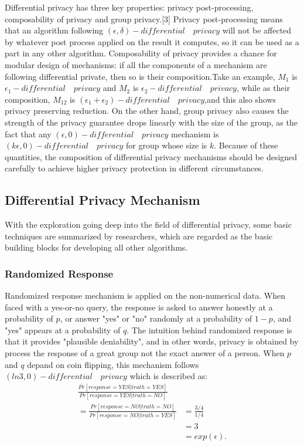\documentclass[conference]{IEEEtran}
\begin{document}
Differential privacy has three key properties: privacy post-processing, composability of privacy and group privacy.[3] Privacy post-processing means that an algorithm following $(\epsilon,\delta)-differential \quad privacy$ will not be affected by whatever post process applied on the result it computes, so it can be used as a part in any other algorithm. Composability of privacy provides a chance for modular design of mechanisms: if all the components of a mechanism are following differential private, then so is their composition.Take an example, $M_1$ is $\epsilon_1-differential \quad privacy$ and $M_2$ is $\epsilon_2-differential \quad privacy$, while as their composition, $M_12$ is $(\epsilon_1 +\epsilon_2)-differential \quad privacy$,and this also shows privacy preserving reduction. On the other hand, group privacy also causes the strength of the privacy guarantee drops linearly with the size of the group, as the fact that any $(\epsilon,0)-differential \quad privacy$ mechanism is $(k\epsilon,0)-differential \quad privacy$ for group whose size is $k$. Because of these quantities, the composition of differential privacy mechanisms should be designed carefully to achieve higher privacy protection in different circumstances.

\subsection{Differential Privacy Mechanism}
With the exploration going deep into the field of differential privacy, some basic techniques are summarized by researchers, which are regarded as the basic building blocks for developing all other algorithms.

\subsubsection{Randomized Response}
Randomized response mechanism is applied on the non-numerical data. When faced with a yes-or-no query, the response is asked to answer honestly at a probability of $p$, or answer "yes" or "no" randomly at a probability of $1-p$, and "yes" appears at a probability of $q$. The intuition behind randomized response is that it provides "plausible deniability", and in other words, privacy is obtained by process the response of a great group not the exact answer of a person. When $p$ and $q$ depand on coin flipping, this mechanism follows $(ln3,0)-differential \quad privacy$ which is described as:
\begin{equation}
    \begin{split}
        \frac{Pr[response=YES|truth=YES]}{Pr[response=YES|truth=NO]}\\
        =\frac{Pr[response=NO|truth=NO]}{Pr[response=NO|truth=YES]}
        &=\frac{3/4}{1/4}\\
        &=3\\
        &=exp(\epsilon).
    \end{split}
\end{equation}
\end{document}
